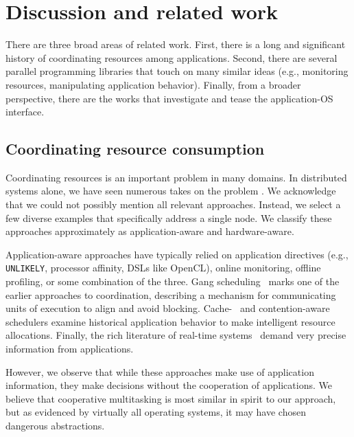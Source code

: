 \section{Discussion and related work}
There are three broad areas of related work. First, there is a long and significant history of coordinating resources among applications. Second, there are several parallel programming libraries that touch on many similar ideas (e.g., monitoring resources, manipulating application behavior). Finally, from a broader perspective, there are the works that investigate and tease the application-OS interface.

\subsection{Coordinating resource consumption}
Coordinating resources is an important problem in many domains. In distributed systems alone, we have seen numerous takes on the problem \cite{yoo2003slurm}\cite{bhattacharya2013hierarchical}\cite{regehr2001using}\cite{chowdhury2014efficient}\cite{waterman2012coordinated}\cite{hindman2011mesos}\cite{ghodsi2011dominant}\cite{henderson1995job}. We acknowledge that we could not possibly mention all relevant approaches. Instead, we select a few diverse examples that specifically address a single node. We classify these approaches approximately as application-aware and hardware-aware.

Application-aware approaches have typically relied on application directives (e.g., \texttt{UNLIKELY}, processor affinity, DSLs like OpenCL), online monitoring, offline profiling, or some combination of the three. Gang scheduling~\cite{ousterhout1982scheduling} marks one of the earlier approaches to coordination, describing a mechanism for communicating units of execution to align and avoid blocking. Cache-~\cite{philbin1996thread} and contention-aware~\cite{blagodurov2010contention} schedulers examine historical application behavior to make intelligent resource allocations. Finally, the rich literature of real-time systems~\cite{liu1973scheduling}\cite{goyal1996hierarchical} demand very precise information from applications.

However, we observe that while these approaches make use of application information, they make decisions without the cooperation of applications. We believe that cooperative multitasking is most similar in spirit to our approach, but as evidenced by virtually all operating systems, it may have chosen dangerous abstractions.

